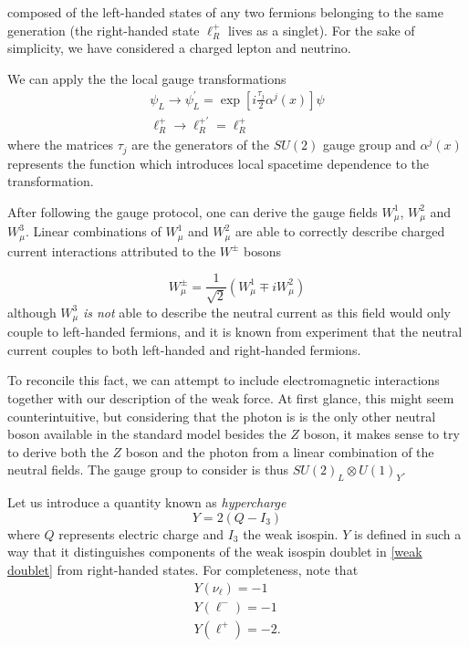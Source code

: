 \documentclass[10pt,a4paper]{book}
\begin{document}
composed of the left-handed states of any two fermions belonging to the same generation (the right-handed state $\ell^+_R$ lives as a singlet). For the sake of simplicity, we have considered a charged lepton and neutrino. 

We can apply the the local gauge transformations
\begin{gather}
    \label{su2 transformation}
    \psi_L \rightarrow \psi_L^\prime = \exp[i\frac{\tau_j}{2}\alpha^j(x)]\psi \\
    \ell_R^+ \rightarrow \ell_R^{+\prime} = \ell_R^+
\end{gather}
where the matrices $\tau_j$ are the generators of the $SU(2)$ gauge group and $\alpha^j(x)$ represents the function which introduces local spacetime dependence to the transformation.

After following the gauge protocol, one can derive the gauge fields $W^1_\mu$, $W^2_\mu$ and $W^3_\mu$. Linear combinations of $W^1_\mu$ and $W^2_\mu$ are able to correctly describe charged current interactions attributed to the $W^\pm$ bosons

\begin{equation}
    W^\pm_\mu =    \frac{1}{\sqrt{2}}(W^1_\mu \mp i W^2_\mu)
    \label{Wpm}
\end{equation}
although $W^3_\mu$ \emph{is not} able to describe the neutral current as this field would only couple to left-handed fermions, and it is known from experiment that the neutral current couples to both left-handed and right-handed fermions.

To reconcile this fact, we can attempt to include electromagnetic interactions together with our description of the weak force. At first glance, this might seem counterintuitive, but considering that the photon is is the only other neutral boson available in the standard model besides the $Z$ boson, it makes sense to try to derive both the $Z$ boson and the photon from a linear combination of the neutral fields. The gauge group to consider is thus $SU(2)_L \otimes U(1)_Y$.

Let us introduce a quantity known as \emph{hypercharge}
\begin{equation}
    Y = 2(Q - I_3)
\end{equation}
where $Q$ represents electric charge and $I_3$ the weak isospin. $Y$ is defined in such a way that it distinguishes components of the weak isospin doublet in \ref{weak doublet} from right-handed states. For completeness, note that
\begin{gather}
    Y(\nu_\ell) = -1 \\
    Y(\ell^-) = -1\\
    Y(\ell^+) = -2.
\end{gather}
\end{document}
